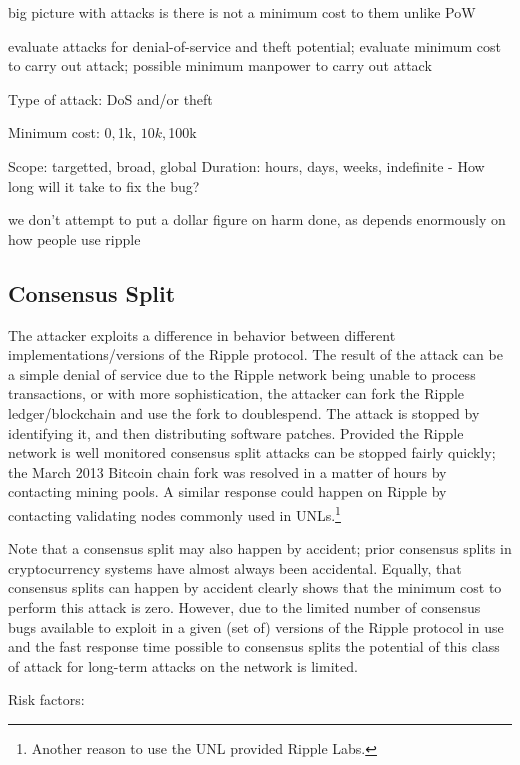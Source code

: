 \documentclass{article}
\begin{document}
big picture with attacks is there is not a minimum cost to them unlike PoW

evaluate attacks for denial-of-service and theft potential; evaluate minimum
cost to carry out attack; possible minimum manpower to carry out attack


Type of attack: DoS and/or theft

Minimum cost: $0, $1k, $10k, $100k

Scope: targetted, broad, global
Duration: hours, days, weeks, indefinite - How long will it take to fix the bug?

we don't attempt to put a dollar figure on harm done, as depends enormously on
how people use ripple


\subsection{Consensus Split}

The attacker exploits a difference in behavior between different
implementations/versions of the Ripple protocol. The result of the attack can
be a simple denial of service due to the Ripple network being unable to process
transactions, or with more sophistication, the attacker can fork the Ripple
ledger/blockchain and use the fork to doublespend. The attack is stopped by
identifying it, and then distributing software patches. Provided the Ripple
network is well monitored consensus split attacks can be stopped fairly
quickly; the March 2013 Bitcoin chain fork\cite{bip50} was resolved in a matter
of hours by contacting mining pools. A similar response could happen on Ripple
by contacting validating nodes commonly used in UNLs.\footnote{Another reason
to use the UNL provided Ripple Labs.}

Note that a consensus split may also happen by accident; prior consensus splits
in cryptocurrency systems have almost always been accidental. Equally, that
consensus splits can happen by accident clearly shows that the minimum cost to
perform this attack is zero. However, due to the limited number of consensus
bugs available to exploit in a given (set of) versions of the Ripple protocol
in use and the fast response time possible to consensus splits the potential of
this class of attack for long-term attacks on the network is limited.

Risk factors:
\end{document}
